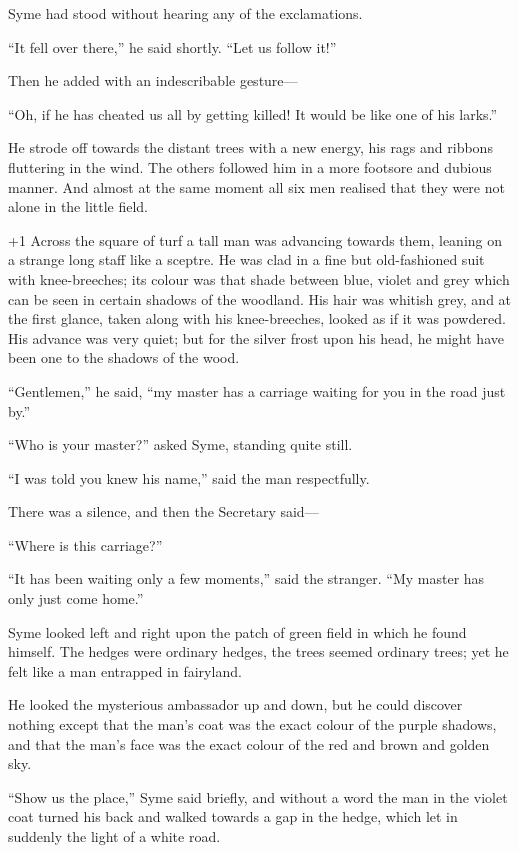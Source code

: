 Syme had stood without hearing any of the exclamations.

“It fell over there,” he said shortly. “Let us follow it!”

Then he added with an indescribable gesture⁠—

“Oh, if he has cheated us all by getting killed! It would be like one of his larks.”

He strode off towards the distant trees with a new energy, his rags and ribbons fluttering in the wind. The others followed him in a more footsore and dubious manner. And almost at the same moment all six men realised that they were not alone in the little field.

\looseness+1
Across the square of turf a tall man was advancing towards them, leaning on a strange long staff like a sceptre. He was clad in a fine but old-fashioned suit with knee-breeches; its colour was that shade between blue, violet and grey which can be seen in certain shadows of the woodland. His hair was whitish grey, and at the first glance, taken along with his knee-breeches, looked as if it was powdered. His advance was very quiet; but for the silver frost upon his head, he might have been one to the shadows of the wood.

“Gentlemen,” he said, “my master has a carriage waiting for you in the road just by.”

“Who is your master?” asked Syme, standing quite still.

“I was told you knew his name,” said the man respectfully.

There was a silence, and then the Secretary said⁠—

“Where is this carriage?”

“It has been waiting only a few moments,” said the stranger. “My master has only just come home.”

Syme looked left and right upon the patch of green field in which he found himself. The hedges were ordinary hedges, the trees seemed ordinary trees; yet he felt like a man entrapped in fairyland.

He looked the mysterious ambassador up and down, but he could discover nothing except that the man’s coat was the exact colour of the purple shadows, and that the man’s face was the exact colour of the red and brown and golden sky.

“Show us the place,” Syme said briefly, and without a word the man in the violet coat turned his back and walked towards a gap in the hedge, which let in suddenly the light of a white road.

